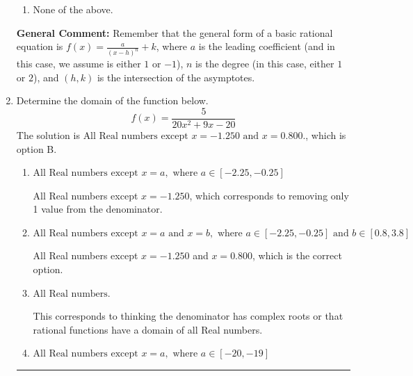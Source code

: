 \documentclass{extbook}[14pt]
\newcommand{\litem}[1]{\item #1

\rule{\textwidth}{0.4pt}}
\begin{document}
\begin{enumerate}
{\begin{enumerate}[label=\Alph*.]
\item None of the above.\end{enumerate}
\textbf{General Comment:} Remember that the general form of a basic rational equation is $ f(x) = \frac{a}{(x-h)^n} + k$, where $a$ is the leading coefficient (and in this case, we assume is either $1$ or $-1$), $n$ is the degree (in this case, either $1$ or $2$), and $(h, k)$ is the intersection of the asymptotes.
}
\litem{
Determine the domain of the function below.
\[ f(x) = \frac{5}{20x^{2} +9 x -20} \]The solution is \( \text{All Real numbers except } x = -1.250 \text{ and } x = 0.800. \), which is option B.\begin{enumerate}[label=\Alph*.]
\item \( \text{All Real numbers except } x = a, \text{ where } a \in [-2.25, -0.25] \)

All Real numbers except $x = -1.250$, which corresponds to removing only 1 value from the denominator.
\item \( \text{All Real numbers except } x = a \text{ and } x = b, \text{ where } a \in [-2.25, -0.25] \text{ and } b \in [0.8, 3.8] \)

All Real numbers except $x = -1.250$ and $x = 0.800$, which is the correct option.
\item \( \text{All Real numbers.} \)

This corresponds to thinking the denominator has complex roots or that rational functions have a domain of all Real numbers.
\item \( \text{All Real numbers except } x = a, \text{ where } a \in [-20, -19] \)


\end{enumerate}}
\end{enumerate}
\end{document}
